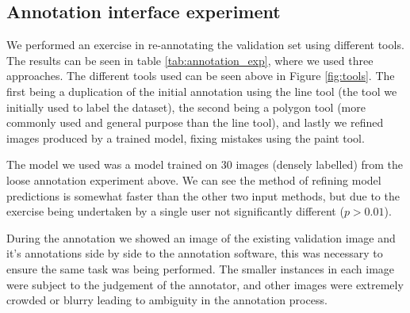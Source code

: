 \documentclass{IEEEtran}
\begin{document}
\begin{table}[!ht]
  \centering
    \caption{Statistics from re-annotation test set}

\noindent{}

\label{tab:loose_exp}
\end{table}






\subsection {Annotation interface experiment}



We performed an exercise in re-annotating the validation set using different tools. The results can be seen in table \ref{tab:annotation_exp}, where we used three approaches. The different tools used can be seen above in Figure \ref{fig:tools}.  The first being a duplication of the initial annotation using the line tool (the tool we initially used to label the dataset), the second being a polygon tool (more commonly used and general purpose than the line tool), and lastly we refined images produced by a trained model, fixing mistakes using the paint tool.

The model we used was a model trained on 30 images (densely labelled) from the loose annotation experiment above. We can see the method of refining model predictions is somewhat faster than the other two input methods, but due to the exercise being undertaken by a single user not significantly different ($ p > 0.01 $).

During the annotation we showed an image of the existing validation image and it's annotations side by side to the annotation software, this was necessary to ensure the same task was being performed. The smaller instances in each image were subject to the judgement of the annotator, and other images were extremely crowded or blurry leading to ambiguity in the annotation process. 
\end{document}
